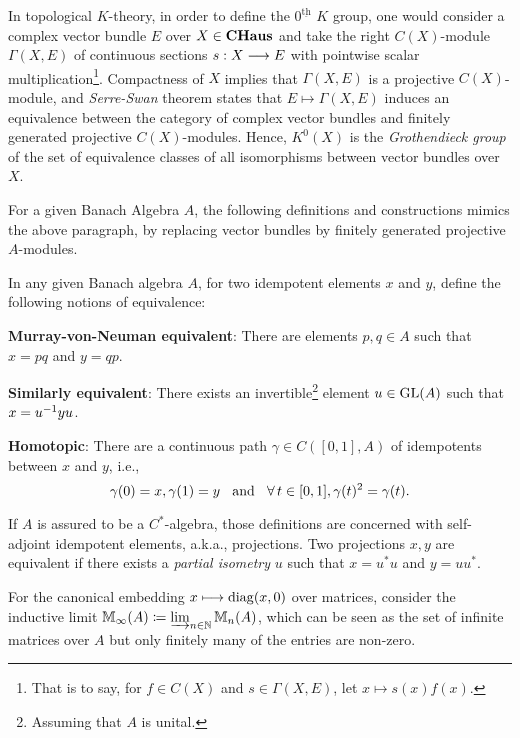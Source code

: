 In topological $K$-theory, in order to define the $0^{\underline{\text{th}}}$ $K$ group, one would consider a complex vector bundle $E$ over $X \in \boldsymbol{\operatorname{CHaus}}$ and take the right $C(X)$-module $\Gamma(X,E)$ of continuous sections $s:X\longrightarrow E$ with pointwise scalar multiplication\footnote{That is to say, for $f\in C(X)$ and $s\in \Gamma(X,E)$, let $x\longmapsto s(x)f(x)$.}. Compactness of $X$ implies that $\Gamma(X,E)$ is a projective $C(X)$-module, and \textit{Serre-Swan} theorem  \cite[Theorem 6.18.]{karoubi2008k} states that $E\longmapsto \Gamma(X,E)$ induces an equivalence between the category of complex vector bundles and finitely generated projective $C(X)$-modules. Hence, $K^0(X)$ is the \textit{Grothendieck group} of the set of equivalence classes of all isomorphisms between vector bundles over $X$.

For a given Banach Algebra $A$, the following definitions and constructions mimics the above paragraph, by replacing vector bundles by finitely generated projective $A$-modules. 

\begin{definicao}
\label{def: idempotentes equivalentes}
In any given Banach algebra $A$, for two idempotent elements $x$ and $y$, define the following notions of equivalence: 
\begin{itroman}
\item \textbf{Murray-von-Neuman equivalent}: There are elements $p,q\in A$ such that $x=pq$ and $y=qp$.
\item \textbf{Similarly equivalent}: There exists an invertible\footnote{Assuming that $A$ is unital.} element $u\in \operatorname{GL}(A)$ such that $x = {u}^{-1} y u$.
\item \textbf{Homotopic}: There are a continuous path  $\gamma \in C([0,1], A)$ of idempotents between $x$ and $y$, i.e.,
\begin{equation*}
    \gamma(0) = x, \gamma(1)=y \hspace{0.25cm}\operatorname{and}\hspace{0.25cm} \forall\,t\in [0,1], \gamma(t)^2 = \gamma(t).
\end{equation*}
\end{itroman}
If $A$ is assured to be a $C^*$-algebra, those definitions are concerned with self-adjoint idempotent elements, a.k.a., projections. Two projections $x, y$ are equivalent if there exists a \textit{partial isometry} $u$ such that $x= u^*u$ and $y=uu^*$.
\end{definicao}



For the canonical embedding $x \longmapsto \operatorname{diag}(x,0)$ over matrices, consider the inductive limit $\mathbb M_\infty(A) \coloneqq \varinjlim_{n\in \operatorname{\mathbb{N}}} \mathbb M_n(A)$, which can be seen as the set of infinite matrices over $A$ but only finitely many of the entries are non-zero. 


